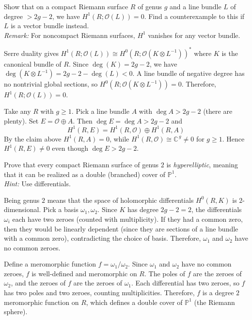 \documentclass[12pt]{article}  %
\begin{document}
\begin{problem}[4]
Show that on a compact Riemann surface $R$ of genus $g$ and a line bundle $L$ of degree $> 2g-2$, we have $H^1(R; \mathcal{O}(L)) = 0$. Find a counterexample to this if $L$ is a vector bundle instead.\\
\textit{Remark:} For noncompact Riemann surfaces, $H^1$ vanishes for any vector bundle.
\end{problem}

\begin{solution}
    Serre duality gives $H^1(R; \mathcal{O}(L)) \cong H^0(R; \mathcal{O}(K \otimes L^{-1}))^*$ where $K$ is the canonical bundle of $R$. Since $\deg(K) = 2g-2$, we have $\deg(K \otimes L^{-1}) = 2g-2 - \deg(L) < 0$. A line bundle of negative degree has no nontrivial global sections, so $H^0(R; \mathcal{O}(K \otimes L^{-1})) = 0$. Therefore, $H^1(R; \mathcal{O}(L)) = 0$.

    Take any $R$ with $g\ge 1$. Pick a line bundle $A$ with $\deg A>2g-2$ (there are plenty). Set $E = \mathcal O \oplus A$. Then $\deg E=\deg A>2g-2$ and \[H^1(R,E) = H^1(R,\mathcal O) \oplus H^1(R,A)\] By the claim above $H^1(R,A)=0$, while $H^1(R,\mathcal O)\cong \mathbb C^{\,g}\neq 0$ for $g\ge 1$. Hence $H^1(R,E)\neq 0$ even though $\deg E>2g-2$.
\end{solution}

\begin{problem}[5]
Prove that every compact Riemann surface of genus $2$ is \textit{hyperelliptic}, meaning that it can be realized as a double (branched) cover of $\mathbb{P}^1$.\\
\textit{Hint:} Use differentials.
\end{problem}

\begin{solution}
    Being genus $2$ means that the space of holomorphic differentials $H^0(R, K)$ is $2$-dimensional. Pick a basis $\omega_1, \omega_2$. Since $K$ has degree $2g-2=2$, the differentials $\omega_i$ each have two zeroes (counted with multiplicity). If they had a common zero, then they would be linearly dependent (since they are sections of a line bundle with a common zero), contradicting the choice of basis. Therefore, $\omega_1$ and $\omega_2$ have no common zeroes.

    Define a meromorphic function $f = \omega_1/\omega_2$. Since $\omega_1$ and $\omega_2$ have no common zeroes, $f$ is well-defined and meromorphic on $R$. The poles of $f$ are the zeroes of $\omega_2$, and the zeroes of $f$ are the zeroes of $\omega_1$. Each differential has two zeroes, so $f$ has two poles and two zeroes, counting multiplicities. Therefore, $f$ is a degree $2$ meromorphic function on $R$, which defines a double cover of $\mathbb{P}^1$ (the Riemann sphere).
\end{solution}
\end{document}
